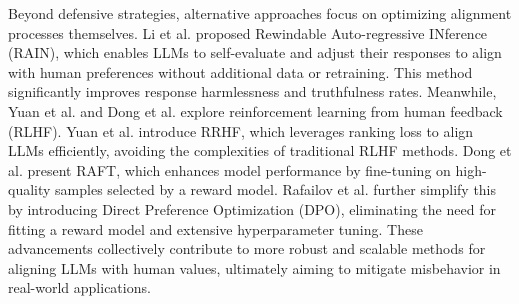 Beyond defensive strategies, alternative approaches focus on optimizing alignment processes themselves. Li et al. \cite{li_2024d} proposed Rewindable Auto-regressive INference (RAIN), which enables LLMs to self-evaluate and adjust their responses to align with human preferences without additional data or retraining. This method significantly improves response harmlessness and truthfulness rates. Meanwhile, Yuan et al. \cite{yuan_2023a} and Dong et al. \cite{dong_2023a} explore reinforcement learning from human feedback (RLHF). Yuan et al. \cite{yuan_2023a} introduce RRHF, which leverages ranking loss to align LLMs efficiently, avoiding the complexities of traditional RLHF methods. Dong et al. \cite{dong_2023a} present RAFT, which enhances model performance by fine-tuning on high-quality samples selected by a reward model. Rafailov et al. \cite{rafailov_2023a} further simplify this by introducing Direct Preference Optimization (DPO), eliminating the need for fitting a reward model and extensive hyperparameter tuning. These advancements collectively contribute to more robust and scalable methods for aligning LLMs with human values, ultimately aiming to mitigate misbehavior in real-world applications.

